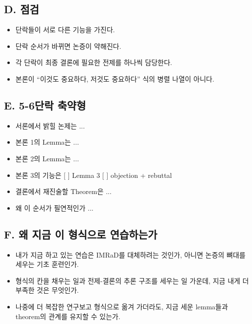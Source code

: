 \subsection{D. 점검}\label{d-uxc810uxac80-1}

\begin{itemize}
\tightlist
\item[$\square$]
  단락들이 서로 다른 기능을 가진다.
\item[$\square$]
  단락 순서가 바뀌면 논증이 약해진다.
\item[$\square$]
  각 단락이 최종 결론에 필요한 전제를 하나씩 담당한다.
\item[$\square$]
  본론이 ``이것도 중요하다, 저것도 중요하다'' 식의 병렬 나열이 아니다.
\end{itemize}

\subsection{E. 5-6단락 축약형}\label{e-5-6uxb2e8uxb77d-uxcd95uxc57duxd615}

\begin{itemize}
\tightlist
\item
  서론에서 밝힐 논제는 ...
\item
  본론 1의 Lemma는 ...
\item
  본론 2의 Lemma는 ...
\item
  본론 3의 기능은 {[} {]} Lemma 3 {[} {]} objection + rebuttal
\item
  결론에서 재진술할 Theorem은 ...
\item
  왜 이 순서가 필연적인가 ...
\end{itemize}

\subsection{F. 왜 지금 이 형식으로 연습하는가}\label{f-uxc65c-uxc9c0uxae08-uxc774-uxd615uxc2dduxc73cuxb85c-uxc5f0uxc2b5uxd558uxb294uxac00}

\begin{itemize}
\tightlist
\item
  내가 지금 하고 있는 연습은 IMRaD를 대체하려는 것인가, 아니면 논증의 뼈대를 세우는 기초 훈련인가.
\item
  형식의 칸을 채우는 일과 전제-결론의 추론 구조를 세우는 일 가운데, 지금 내게 더 부족한 것은 무엇인가.
\item
  나중에 더 복잡한 연구보고 형식으로 옮겨 가더라도, 지금 세운 lemma들과 theorem의 관계를 유지할 수 있는가.
\end{itemize}

